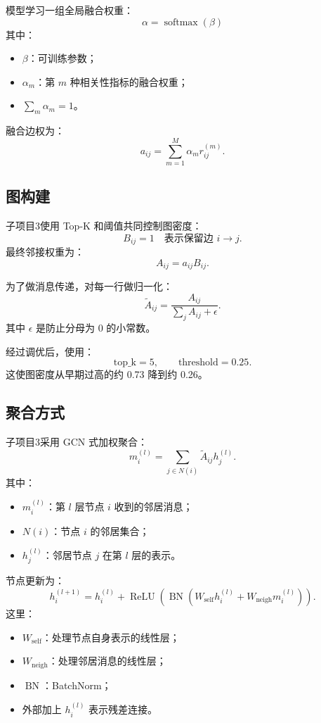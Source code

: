 \documentclass[UTF8]{ctexart}
\begin{document}
模型学习一组全局融合权重：
\[
\alpha=\operatorname{softmax}(\beta)
\]
其中：
\begin{itemize}
    \item \(\beta\)：可训练参数；
    \item \(\alpha_m\)：第 \(m\) 种相关性指标的融合权重；
    \item \(\sum_m\alpha_m=1\)。
\end{itemize}

融合边权为：
\[
a_{ij}=\sum_{m=1}^{M}\alpha_m r_{ij}^{(m)}.
\]

\subsection{图构建}

子项目3使用 Top-K 和阈值共同控制图密度：
\[
B_{ij}=1
\quad \text{表示保留边 } i\rightarrow j.
\]
最终邻接权重为：
\[
A_{ij}=a_{ij}B_{ij}.
\]

为了做消息传递，对每一行做归一化：
\[
\tilde{A}_{ij}
=
\frac{A_{ij}}{\sum_j A_{ij}+\epsilon}.
\]
其中 \(\epsilon\) 是防止分母为 0 的小常数。

经过调优后，使用：
\[
\text{top\_k}=5,\qquad \text{threshold}=0.25.
\]
这使图密度从早期过高的约 0.73 降到约 0.26。

\subsection{聚合方式}

子项目3采用 GCN 式加权聚合：
\[
m_i^{(l)}
=
\sum_{j\in N(i)}
\tilde{A}_{ij}h_j^{(l)}.
\]
其中：
\begin{itemize}
    \item \(m_i^{(l)}\)：第 \(l\) 层节点 \(i\) 收到的邻居消息；
    \item \(N(i)\)：节点 \(i\) 的邻居集合；
    \item \(h_j^{(l)}\)：邻居节点 \(j\) 在第 \(l\) 层的表示。
\end{itemize}

节点更新为：
\[
h_i^{(l+1)}
=
h_i^{(l)}
+
\operatorname{ReLU}
\left(
\operatorname{BN}
\left(
W_{\text{self}}h_i^{(l)}
+
W_{\text{neigh}}m_i^{(l)}
\right)
\right).
\]
这里：
\begin{itemize}
    \item \(W_{\text{self}}\)：处理节点自身表示的线性层；
    \item \(W_{\text{neigh}}\)：处理邻居消息的线性层；
    \item \(\operatorname{BN}\)：BatchNorm；
    \item 外部加上 \(h_i^{(l)}\) 表示残差连接。
\end{itemize}
\end{document}

